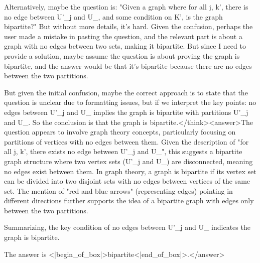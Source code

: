 Alternatively, maybe the question is: "Given a graph where for all j, k', there is no edge between U'_j and U_, and some condition on K', is the graph bipartite?" But without more details, it's hard. Given the confusion, perhaps the user made a mistake in pasting the question, and the relevant part is about a graph with no edges between two sets, making it bipartite. But since I need to provide a solution, maybe assume the question is about proving the graph is bipartite, and the answer would be that it's bipartite because there are no edges between the two partitions.

But given the initial confusion, maybe the correct approach is to state that the question is unclear due to formatting issues, but if we interpret the key points: no edges between U'_j and U_ implies the graph is bipartite with partitions U'_j and U_. So the conclusion is that the graph is bipartite.</think><answer>The question appears to involve graph theory concepts, particularly focusing on partitions of vertices with no edges between them. Given the description of "for all j, k', there exists no edge between U'_j and U_", this suggests a bipartite graph structure where two vertex sets (U'_j and U_) are disconnected, meaning no edges exist between them. In graph theory, a graph is bipartite if its vertex set can be divided into two disjoint sets with no edges between vertices of the same set. The mention of "red and blue arrows" (representing edges) pointing in different directions further supports the idea of a bipartite graph with edges only between the two partitions.  

Summarizing, the key condition of no edges between U'_j and U_ indicates the graph is bipartite.  

The answer is <|begin_of_box|>bipartite<|end_of_box|>.</answer>